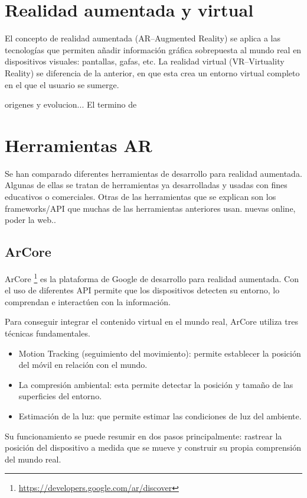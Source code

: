 

\section{Realidad aumentada y virtual}
El concepto de realidad aumentada (AR--Augmented Reality) se aplica a las tecnologías que permiten añadir información gráfica sobrepuesta al mundo real en dispositivos visuales: pantallas, gafas, etc.
La realidad virtual (VR--Virtuality Reality) se diferencia de la anterior, en que esta crea un entorno virtual completo en el que el usuario se sumerge.
 
origenes y evolucion...
El termino de 



\section{Herramientas AR}
Se han comparado diferentes herramientas de desarrollo para realidad aumentada. 
Algunas de ellas se tratan de herramientas ya desarrolladas y usadas con fines educativos o comerciales. Otras de las herramientas que se explican son los frameworks/API que muchas de las herramientas anteriores usan.
nuevas online, poder la web.. 

\subsection{ArCore}
ArCore \footnote{\url{https://developers.google.com/ar/discover}} es la plataforma de Google de desarrollo para realidad aumentada. Con el uso de diferentes API permite que los dispositivos detecten su entorno, lo comprendan e interactúen con la información.

Para conseguir integrar el contenido virtual en el mundo real, ArCore utiliza tres técnicas fundamentales.
\begin{itemize}
	\item Motion Tracking (seguimiento del movimiento): permite establecer la posición del móvil en relación con el mundo.
	\item La compresión ambiental: esta permite detectar la posición y tamaño de las superficies del entorno.
	\item Estimación de la luz: que permite estimar las condiciones de luz del ambiente.
\end{itemize}

Su funcionamiento se puede resumir en dos pasos principalmente: rastrear la posición del dispositivo a medida que se mueve y construir su propia comprensión del mundo real.

